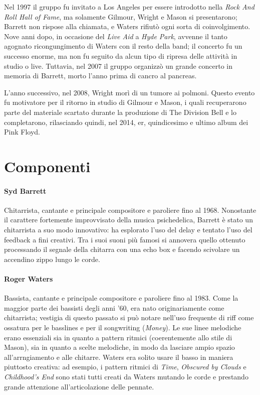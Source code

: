 \documentclass[class=book, crop=false, oneside, 12pt]{standalone}
\begin{document}
    Nel 1997 il gruppo fu invitato a Los Angeles per essere introdotto nella \emph{Rock And Roll Hall of Fame}, ma solamente Gilmour, Wright e Mason si presentarono; Barrett non rispose alla chiamata, e Waters rifiutò ogni sorta di coinvolgimento. Nove anni dopo, in occasione del \emph{Live Aid} a \emph{Hyde Park}, avvenne il tanto agognato ricongungimento di Waters con il resto della band; il concerto fu un successo enorme, ma non fu seguito da alcun tipo di ripresa delle attività in studio o live. Tuttavia, nel 2007 il gruppo organizzò un grande concerto in memoria di Barrett, morto l'anno prima di cancro al pancreas.

    L'anno successivo, nel 2008, Wright morì di un tumore ai polmoni. Questo evento fu motivatore per il ritorno in studio di Gilmour e Mason, i quali recuperarono parte del materiale scartato durante la produzione di The Division Bell e lo completarono, rilasciando quindi, nel 2014, \acrfull{er}, quindicesimo e ultimo album dei Pink Floyd.

    \section{Componenti}\label{sec:01-componenti}
    \paragraph{Syd Barrett}
    Chitarrista, cantante e principale compositore e paroliere fino al 1968. Nonostante il carattere fortemente improvvisato della musica psichedelica, Barrett è stato un chitarrista a suo modo innovativo: ha esplorato l'uso del delay e tentato l'uso del feedback a fini creativi. Tra i suoi suoni più famosi si annovera quello ottenuto processando il segnale della chitarra con una echo box e facendo scivolare un accendino zippo lungo le corde. 
    \paragraph{Roger Waters}
    Bassista, cantante e principale compositore e paroliere fino al 1983. Come la maggior parte dei bassisti degli anni '60, era nato originariamente come chitarrista; vestigia di questo passato si può notare nell'uso frequente di riff come ossatura per le basslines e per il songwriting (\emph{Money}). Le sue linee melodiche erano essenziali sia in quanto a pattern ritmici (coerentemente allo stile di Mason), sia in quanto a scelte melodiche, in modo da lasciare ampio spazio all'arrngiamento e alle chitarre. Waters era solito usare il basso in maniera piuttosto creativa: ad esempio, i pattern ritmici di \emph{Time}, \emph{Obscured by Clouds} e \emph{Childhood's End} sono stati tutti creati da Waters mutando le corde e prestando grande attenzione all'articolazione delle pennate.
\end{document}
